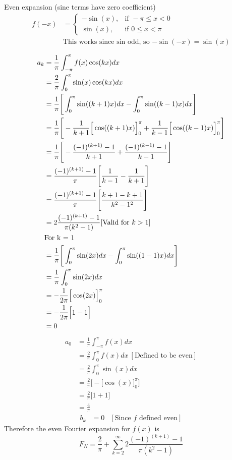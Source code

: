 \documentclass{article}
\begin{document}
\begin{enumerate}
    Even expansion (sine terms have zero coefficient)
    \begin{align*}
        f(-x) &= 
        \begin{cases}
            -\sin(x),&\text{if } -\pi \leq x < 0\\
            \sin(x), &\text{if } 0 \leq x < \pi
        \end{cases} \\&\text{This works since sin odd, so $-\sin(-x) = \sin(x)$} 
    \end{align*}
    \begin{multicols}{2}    
    \noindent
    \begin{align*}
        a_k &= \frac{1}{\pi}\int_{-\pi}^{\pi}f(x)\cos(kx)dx \\ 
        &= \frac{2}{\pi} \int_{0}^{\pi}\sin(x)\cos(kx)dx \\
        &= \frac{1}{\pi} \Bigg[ \int_{0}^{\pi}\sin((k+1)x)dx - \int_{0}^{\pi}\sin((k-1)x)dx\Bigg]\\
        &= \frac{1}{\pi} \Bigg[- \frac{1}{k+1}\Big[\cos((k+1)x) \Big]_{0}^{\pi} + \frac{1}{k-1}\Big[\cos((k-1)x)\Big]_{0}^{\pi}\Bigg]\\
        &= \frac{1}{\pi} \Bigg[- \frac{(-1)^{(k+1)} -1}{k+1} + \frac{(-1)^{(k-1)} -1}{k-1}\Bigg]\\
        &= \frac{(-1)^{(k+1)} -1}{\pi} \Bigg[\frac{1}{k-1} - \frac{1}{k+1}\Bigg]\\
        &= \frac{(-1)^{(k+1)} -1}{\pi} \Bigg[\frac{k + 1 - k + 1}{k^2-1^2}\Bigg]\\
        &= 2\frac{(-1)^{(k+1)} -1}{\pi(k^2 - 1)} [\text{Valid for $ k > 1$}] \\
        &\text{For k = 1}\\
        &= \frac{1}{\pi} \Bigg[ \int_{0}^{\pi}\sin(2x)dx - \int_{0}^{\pi}\sin((1-1)x)dx\Bigg]\\
        &= \frac{1}{\pi} \int_{0}^{\pi}\sin(2x)dx \\
        &= -\frac{1}{2\pi}\Big[\cos(2x)\Big]_{0}^{\pi} \\
        &= -\frac{1}{2\pi}\Big[1 - 1\Big] \\
        &= 0 \\
    \end{align*}
    \begin{align*}
        a_0 &= \frac{1}{\pi}\int_{-\pi}^{\pi}f(x)dx \\ 
        &= \frac{2}{\pi}\int_{0}^{\pi}f(x)dx\: [\text{Defined to be even}] \\ 
        &= \frac{2}{\pi} \int_{0}^{\pi}\sin(x)dx \\ 
        &= \frac{2}{\pi}\Bigg[- \Big[\cos(x)\Big]_{0}^{\pi} \Bigg] \\ 
        &= \frac{2}{\pi} \Bigg[ 1 + 1 \Bigg] \\ 
        &= \frac{4}{\pi}
    \end{align*}
    \begin{align*}
        b_k &= 0 & [\text{Since $f$ defined even}]
    \end{align*}
        Therefore the even Fourier expansion for $f(x)$ is 
        \[
        F_N = \frac{2}{\pi} + \sum_{k=2}^{\infty} 2\frac{(-1)^{(k+1)} -1}{\pi(k^2 - 1)}
        \]


\end{multicols}
\end{enumerate}
\end{document}
